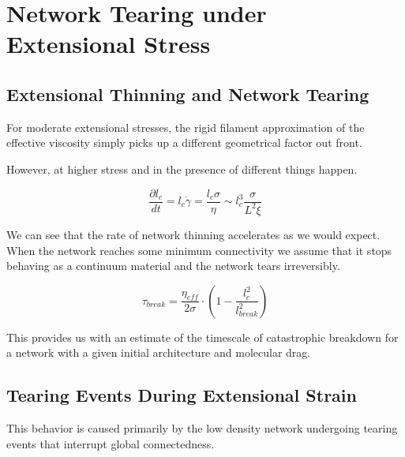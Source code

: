 \documentclass[pre,reprint]{revtex4-1}
\begin{document}
\section{Network Tearing under Extensional Stress}


\subsection{Extensional Thinning and Network Tearing}

For moderate extensional stresses, the rigid filament approximation of the effective viscosity simply picks up a different geometrical factor out front.  

However, at higher stress and in the presence of different things happen.

\begin{equation}
\frac{\partial l_c}{dt}=l_c\dot \gamma =\frac{l_c \sigma}{\eta}\sim l_c^3\frac{ \sigma}{L^2 \xi}
\end{equation}

We can see that the rate of network thinning accelerates as we would expect.  When the network reaches some minimum connectivity we assume that it stops behaving as a continuum material and the network tears irreversibly.  

\begin{equation}
\tau_{break} = \frac{\eta_{eff}}{2\sigma}\cdot\left ( 1 -\frac{l_c^2}{l_{break}^2} \right )
\end{equation}

This provides us with an estimate of the timescale of catastrophic breakdown for a network with a given initial architecture and molecular drag.


\subsection{Tearing Events During Extensional Strain}

This behavior is caused primarily by the low density network undergoing tearing events that interrupt global connectedness.  
\end{document}
